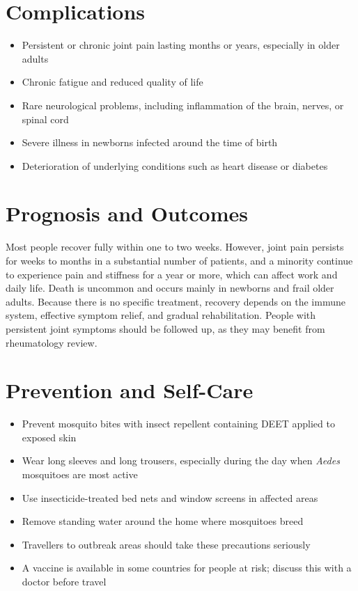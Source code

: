 \section*{Complications}
\begin{itemize}
    \item Persistent or chronic joint pain lasting months or years, especially in older adults
    \item Chronic fatigue and reduced quality of life
    \item Rare neurological problems, including inflammation of the brain, nerves, or spinal cord
    \item Severe illness in newborns infected around the time of birth
    \item Deterioration of underlying conditions such as heart disease or diabetes
\end{itemize}

\section*{Prognosis and Outcomes}
Most people recover fully within one to two weeks. However, joint pain persists for weeks to months in a substantial number of patients, and a minority continue to experience pain and stiffness for a year or more, which can affect work and daily life. Death is uncommon and occurs mainly in newborns and frail older adults. Because there is no specific treatment, recovery depends on the immune system, effective symptom relief, and gradual rehabilitation. People with persistent joint symptoms should be followed up, as they may benefit from rheumatology review.

\section*{Prevention and Self-Care}
\begin{itemize}
    \item Prevent mosquito bites with insect repellent containing DEET applied to exposed skin
    \item Wear long sleeves and long trousers, especially during the day when \textit{Aedes} mosquitoes are most active
    \item Use insecticide-treated bed nets and window screens in affected areas
    \item Remove standing water around the home where mosquitoes breed
    \item Travellers to outbreak areas should take these precautions seriously
    \item A vaccine is available in some countries for people at risk; discuss this with a doctor before travel
\end{itemize}

